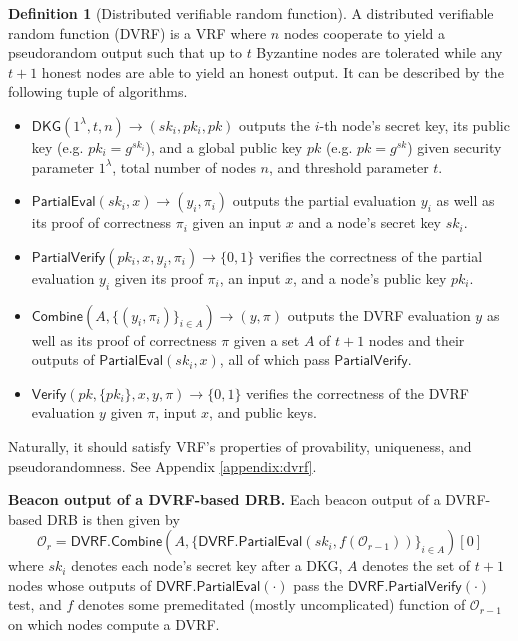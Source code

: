 \documentclass[letterpaper,twocolumn,10pt]{article}
\theoremstyle{definition}
\newtheorem{definition}[theorem]{Definition}
\theoremstyle{remark}
\begin{document}
\begin{definition}[Distributed verifiable random function]
A distributed verifiable random function (DVRF) is a VRF where $n$ nodes cooperate to yield a pseudorandom output such that up to $t$ Byzantine nodes are tolerated while any $t + 1$ honest nodes are able to yield an honest output. It can be described by the following tuple of algorithms.
\begin{itemize}
\item $\mathsf{DKG}(1^\lambda, t, n) \rightarrow (sk_i, pk_i, pk)$ outputs the $i$-th node's secret key, its public key (e.g. $pk_i = g^{sk_i}$), and a global public key $pk$ (e.g. $pk = g^{sk}$) given security parameter $1^\lambda$, total number of nodes $n$, and threshold parameter $t$.
\item $\mathsf{PartialEval}(sk_i, x) \rightarrow (y_i, \pi_i)$ outputs the partial evaluation $y_i$ as well as its proof of correctness $\pi_i$ given an input $x$ and a node's secret key $sk_i$.
\item $\mathsf{PartialVerify}(pk_i, x, y_i, \pi_i) \rightarrow \{0, 1\}$ verifies the correctness of the partial evaluation $y_i$ given its proof $\pi_i$, an input $x$, and a node's public key $pk_i$.
\item $\mathsf{Combine}(A, \{(y_i, \pi_i)\}_{i \in A}) \rightarrow (y, \pi)$ outputs the DVRF evaluation $y$ as well as its proof of correctness $\pi$ given a set $A$ of $t + 1$ nodes and their outputs of $\mathsf{PartialEval}(sk_i, x)$, all of which pass $\mathsf{PartialVerify}$.
\item $\mathsf{Verify}(pk, \{pk_i\}, x, y, \pi) \rightarrow \{0, 1\}$ verifies the correctness of the DVRF evaluation $y$ given $\pi$, input $x$, and public keys.
\end{itemize}
Naturally, it should satisfy VRF's properties of provability, uniqueness, and pseudorandomness. See Appendix \ref{appendix:dvrf}.
\end{definition}

\noindent\textbf{Beacon output of a DVRF-based DRB.} Each beacon output of a DVRF-based DRB is then given by
\begingroup\makeatletter\def\f@size{8}\check@mathfonts
\[
\mathcal{O}_r = \mathsf{DVRF.Combine}(A, \{\mathsf{DVRF.PartialEval}(sk_i, f(\mathcal{O}_{r - 1}))\}_{i \in A})[0]
\]\endgroup
where $sk_i$ denotes each node's secret key after a DKG, $A$ denotes the set of $t + 1$ nodes whose outputs of $\mathsf{DVRF.PartialEval}(\cdot)$ pass the $\mathsf{DVRF.PartialVerify}(\cdot)$ test, and $f$ denotes some premeditated (mostly uncomplicated) function of $\mathcal{O}_{r - 1}$ on which nodes compute a DVRF.
\end{document}
